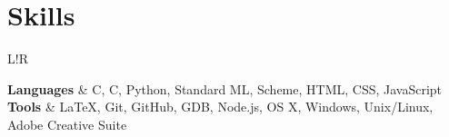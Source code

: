 \documentclass[10pt, letter]{article}
\newcommand\VRule{\color{lightgray}\vrule width 0.5pt}
\newcommand{\CC}{C\nolinebreak\hspace{-.05em}\raisebox{.4ex}{\tiny\bf +}\nolinebreak\hspace{-.10em}\raisebox{.4ex}{\tiny\bf +}}
\def\CC{{C\nolinebreak[4]\hspace{-.05em}\raisebox{.4ex}{\tiny\bf ++}}}
\begin{document}
   
\vspace{6pt}


\vspace{-15pt}
\section*{Skills}
\begin{tabular}{L!{\VRule}R}

\textbf{Languages} & C, \CC, Python, Standard ML, Scheme, HTML, CSS, JavaScript \vspace{6pt}  \\
\textbf{Tools} \vspace{6pt} & \LaTeX, Git, GitHub, GDB, Node.js, OS X, Windows, Unix/Linux, Adobe Creative Suite \\
\end{tabular}
\null
\vfill
\end{document}

